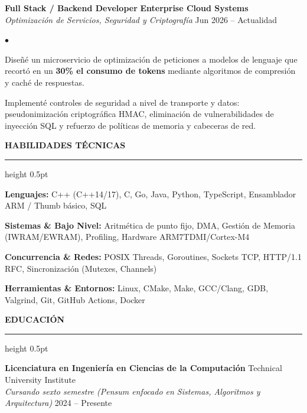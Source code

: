 \documentclass[10pt,letterpaper]{article}
\newcommand{\resumesection}[1]{%
  \vspace{2pt}%
  {\color{primary}\normalsize\bfseries\MakeUppercase{#1}}%
  \vspace{1pt}\hrule height 0.5pt\vspace{2pt}%
}
\renewenvironment{itemize}{%
  \begin{list}{\color{primary}$\bullet$}{%
    \setlength{\leftmargin}{1.1em}%
    \setlength{\itemsep}{0.5pt}%
    \setlength{\topsep}{1pt}%
    \setlength{\parsep}{0pt}%
    \setlength{\partopsep}{0pt}%
  }%
}{%
  \end{list}%
}
\newenvironment{skilllist}{%
  \begin{list}{}{%
    \setlength{\leftmargin}{0pt}%
    \setlength{\itemsep}{0.5pt}%
    \setlength{\topsep}{1pt}%
    \setlength{\parsep}{0pt}%
    \setlength{\partopsep}{0pt}%
  }%
}{%
  \end{list}%
}
\begin{document}
\vspace{1.5pt}

\textbf{Full Stack / Backend Developer} \hfill \textbf{Enterprise Cloud Systems} \\
\textit{Optimización de Servicios, Seguridad y Criptografía} \hfill Jun 2026 -- Actualidad
\begin{itemize}
    \item Diseñé un microservicio de optimización de peticiones a modelos de lenguaje que recortó en un \textbf{30\% el consumo de tokens} mediante algoritmos de compresión y caché de respuestas.
    \item Implementé controles de seguridad a nivel de transporte y datos: pseudonimización criptográfica HMAC, eliminación de vulnerabilidades de inyección SQL y refuerzo de políticas de memoria y cabeceras de red.
\end{itemize}

\resumesection{Habilidades Técnicas}
\begin{skilllist}
    \item \textbf{Lenguajes:} C++ (C++14/17), C, Go, Java, Python, TypeScript, Ensamblador ARM / Thumb básico, SQL
    \item \textbf{Sistemas \& Bajo Nivel:} Aritmética de punto fijo, DMA, Gestión de Memoria (IWRAM/EWRAM), Profiling, Hardware ARM7TDMI/Cortex-M4
    \item \textbf{Concurrencia \& Redes:} POSIX Threads, Goroutines, Sockets TCP, HTTP/1.1 RFC, Sincronización (Mutexes, Channels)
    \item \textbf{Herramientas \& Entornos:} Linux, CMake, Make, GCC/Clang, GDB, Valgrind, Git, GitHub Actions, Docker
\end{skilllist}

\resumesection{Educación}
\textbf{Licenciatura en Ingeniería en Ciencias de la Computación} \hfill Technical University Institute \\
\textit{Cursando sexto semestre (Pensum enfocado en Sistemas, Algoritmos y Arquitectura)} \hfill 2024 -- Presente
\end{document}
